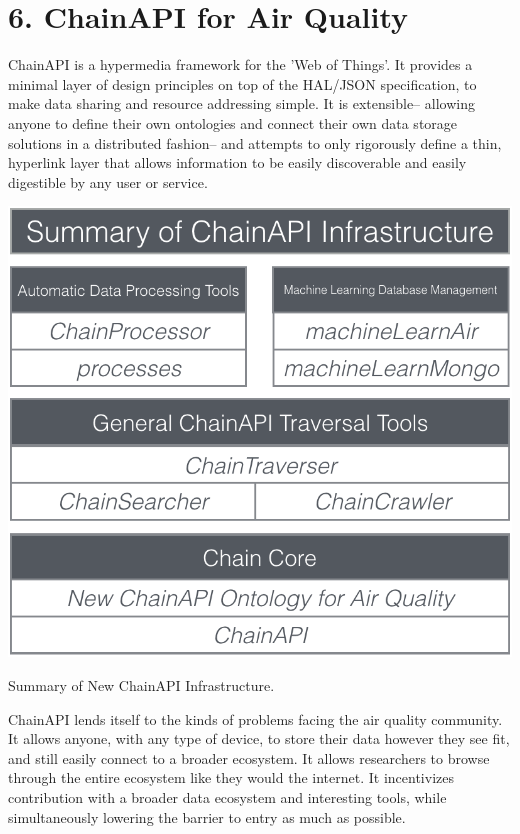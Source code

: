 \chapter{6. ChainAPI for Air Quality}

ChainAPI is a hypermedia framework for the 'Web of Things'.  It provides a minimal layer of design principles on top of the HAL/JSON specification, to make data sharing and resource addressing simple.  It is extensible-- allowing anyone to define their own ontologies and connect their own data storage solutions in a distributed fashion-- and attempts to only rigorously define a thin, hyperlink layer that allows information to be easily discoverable and easily digestible by any user or service.

\begin{marginfigure}
 	\includegraphics[width=\textwidth]{visuals/chainSummary}               
 	 \caption{Summary of New ChainAPI Infrastructure.}
  	\label{fig:chain}
\end{marginfigure}

ChainAPI lends itself to the kinds of problems facing the air quality community.  It allows anyone, with any type of device, to store their data however they see fit, and still easily connect to a broader ecosystem.  It allows researchers to browse through the entire ecosystem like they would the internet.  It incentivizes contribution with a broader data ecosystem and interesting tools, while simultaneously lowering the barrier to entry as much as possible.

